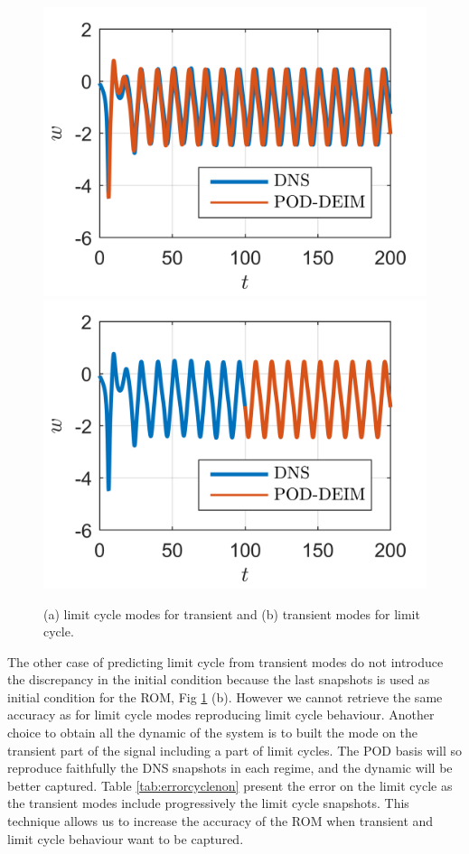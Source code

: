 \documentclass[11pt]{article}
\begin{document}
\begin{figure}
    \centering
    \includegraphics{TimeEvononparallel2}
    \hfill
    \includegraphics{TimeEvononparallel1}
    \caption{%
    	    (a) limit cycle modes for transient and (b) transient modes for limit cycle.
        }
    \label{fig:TImeEvononparallel}
\end{figure}

The other case of predicting limit cycle from transient modes do not introduce the discrepancy in the initial condition because the last snapshots is used as initial condition for the ROM, Fig \ref{fig:TImeEvononparallel} (b). However we cannot retrieve the same accuracy as for limit cycle modes reproducing limit cycle behaviour. Another choice to obtain all the dynamic of the system is to built the mode on the transient part of the signal including a part of limit cycles. The POD basis will so reproduce faithfully the DNS snapshots in each regime, and the dynamic will be better captured. Table \ref{tab:errorcyclenon} present the error on the limit cycle as the transient modes include progressively the limit cycle snapshots. This technique allows us to increase the accuracy of the ROM when transient and limit cycle behaviour want to be captured.
\end{document}
